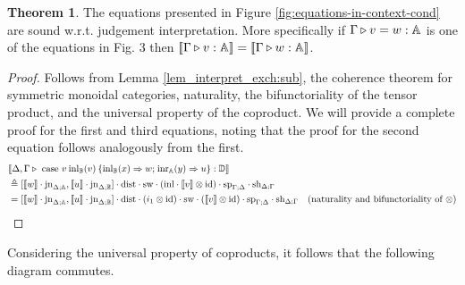 \documentclass[10pt,a4paper]{amsart}
\theoremstyle{definition}
\theoremstyle{definition}
\theoremstyle{definition}
\theoremstyle{definition}
\theoremstyle{definition}
\theoremstyle{definition}
\newtheorem{theorem}[definition]{Theorem}
\begin{document}
\begin{theorem} \label {theorem:eq_in_context}
  The equations presented in Figure \ref{fig:equations-in-context-cond} are sound w.r.t. judgement interpretation. More specifically if $ \Gamma \triangleright v = w: \mathbb{A}$ is one of the equations in Fig. 3 then $[\![ \Gamma \triangleright v: \mathbb{A} ]\!] = [\![ \Gamma \triangleright w: \mathbb{A} ]\!]$.
\end{theorem}

\begin{proof}
  Follows from Lemma \autoref{lem_interpret_exch:sub}, the coherence theorem for symmetric monoidal categories, naturality,  the bifunctoriality of the tensor product, and the universal property of the coproduct.   
  We will provide a complete proof for the first and third equations, noting that the proof for the second equation follows analogously from the first.
  \begin{align*}
    &\llbracket \Delta,\Gamma \triangleright  \text{ case } v \hspace{2pt} \text{inl}_{\mathbb{B}}(v) \hspace{2pt} \{\text{inl}_{\mathbb{B}} (x) \Rightarrow w ; \hspace{1pt} \text{inr}_{\mathbb{A}} (y) \Rightarrow u\}: \mathbb{D}\rrbracket \\
    & \triangleq  [\llbracket w\rrbracket \cdot \text{jn}_{\Delta;\mathbb{A}},\llbracket u \rrbracket\cdot \text{jn}_{\Delta;\mathbb{B}}] \cdot \text{dist} \cdot \text{sw} \cdot (\mathrm{inl} \cdot \llbracket  v \rrbracket \otimes \text{id}) \cdot \text{sp}_{\Gamma;\Delta} \cdot \text{sh}_{\Delta;\Gamma} \\
    & = [\llbracket w\rrbracket \cdot \text{jn}_{\Delta;\mathbb{A}},\llbracket u \rrbracket\cdot \text{jn}_{\Delta;\mathbb{B}}] \cdot \text{dist} \cdot (i_1 \otimes \text{id}) \cdot \text{sw} \cdot ( \llbracket  v \rrbracket \otimes \text{id}) \cdot \text{sp}_{\Gamma;\Delta} \cdot \text{sh}_{\Delta;\Gamma} &{(\text{naturality and bifunctoriality  of } \otimes}) 
  \end{align*}
\end{proof}

Considering the universal property of coproducts, it follows that the following diagram commutes.

\end{document}
